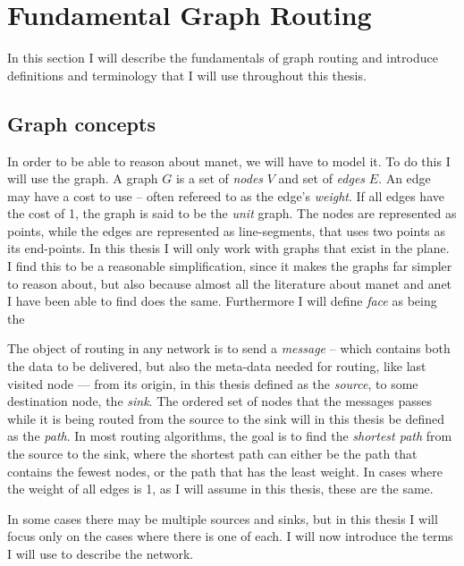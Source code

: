 \section{Fundamental Graph Routing}
\label{section:fundamental_graph_routing}
In this section I will describe the fundamentals of graph routing and introduce definitions and terminology that I will use throughout this thesis.\\

\subsection{Graph concepts}
\label{section:graph_concepts}
In order to be able to reason about \ac{manet}, we will have to model it. To do this I will use the graph. A graph $G$ is a set of \emph{nodes} $V$ and set of \emph{edges} $E$. An edge may have a cost to use -- often refereed to as the edge's \emph{weight}. If all edges have the cost of 1, the graph is said to be the \emph{unit} graph. The nodes are represented as points, while the edges are represented as line-segments, that uses two points as its end-points. In this thesis I will only work with graphs that exist in the plane. I find this to be a reasonable simplification, since it makes the graphs far simpler to reason about, but also because almost all the literature about \ac{manet} and \ac{anet} I have been able to find does the same. Furthermore I will define \emph{face} as being the 

The object of routing in any network is to send a \emph{message} -- which contains both the data to be delivered, but also the meta-data needed for routing, like last visited node --- from its origin, in this thesis defined as the \emph{source}, to some destination node, the \emph{sink}. The ordered set of nodes that the messages passes while it is being routed from the source to the sink will in this thesis be defined as the \emph{path}. In most routing algorithms, the goal is to find the \emph{shortest path} from the source to the sink, where the shortest path can either be the path that contains the fewest nodes, or the path that has the least weight. In cases where the weight of all edges is 1, as I will assume in this thesis, these are the same. 

In some cases there may be multiple sources and sinks, but in this thesis I will focus only on the cases where there is one of each. I will now introduce the terms I will use to describe the network.


